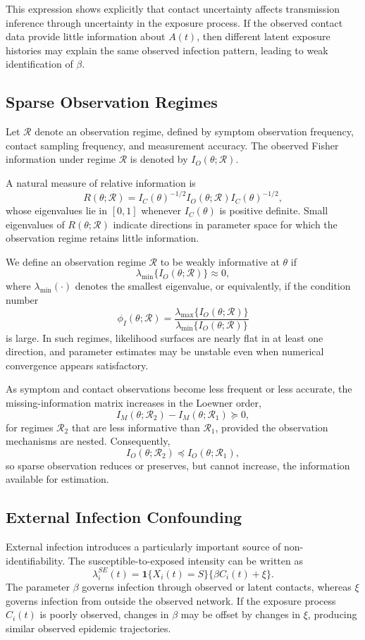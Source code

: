 \documentclass[10pt]{article}
\begin{document}
This expression shows explicitly that contact uncertainty affects transmission inference through uncertainty in the exposure process. If the observed contact data provide little information about $A(t)$, then different latent exposure histories may explain the same observed infection pattern, leading to weak identification of $\beta$.

\subsection{Sparse Observation Regimes}
Let $\mathcal{R}$ denote an observation regime, defined by symptom observation frequency, contact sampling frequency, and measurement accuracy. The observed Fisher information under regime $\mathcal{R}$ is denoted by
$I_O(\theta;\mathcal{R})$.

A natural measure of relative information is
\[
R(\theta;\mathcal{R})
=
I_C(\theta)^{-1/2}
I_O(\theta;\mathcal{R})
I_C(\theta)^{-1/2},
\]
whose eigenvalues lie in $[0,1]$ whenever $I_C(\theta)$ is positive definite. Small eigenvalues of $R(\theta;\mathcal{R})$ indicate directions in parameter space for which the observation regime retains little information.

We define an observation regime $\mathcal{R}$ to be weakly informative at $\theta$ if
\[
\lambda_{\min}\{I_O(\theta;\mathcal{R})\}
\approx 0,
\]
where $\lambda_{\min}(\cdot)$ denotes the smallest eigenvalue, or equivalently, if the condition number
\[
\phi_I(\theta;\mathcal{R})
=
\frac{\lambda_{\max}\{I_O(\theta;\mathcal{R})\}}
{\lambda_{\min}\{I_O(\theta;\mathcal{R})\}}
\]
is large. In such regimes, likelihood surfaces are nearly flat in at least one direction, and parameter estimates may be unstable even when numerical convergence appears satisfactory.

As symptom and contact observations become less frequent or less accurate, the missing-information matrix increases in the Loewner order,
\[
I_M(\theta;\mathcal{R}_2)
-
I_M(\theta;\mathcal{R}_1)
\succeq 0,
\]
for regimes $\mathcal{R}_2$ that are less informative than $\mathcal{R}_1$, provided the observation mechanisms are nested. Consequently,
\[
I_O(\theta;\mathcal{R}_2)
\preceq
I_O(\theta;\mathcal{R}_1),
\]
so sparse observation reduces or preserves, but cannot increase, the information available for estimation.

\subsection{External Infection Confounding}
External infection introduces a particularly important source of non-identifiability. The susceptible-to-exposed intensity can be written as
\[
\lambda_i^{SE}(t)
=
\mathbf{1}\{X_i(t)=S\}
\{\beta C_i(t)+\xi\}.
\]
The parameter $\beta$ governs infection through observed or latent contacts, whereas $\xi$ governs infection from outside the observed network. If the exposure process $C_i(t)$ is poorly observed, changes in $\beta$ may be offset by changes in $\xi$, producing similar observed epidemic trajectories.
\end{document}
